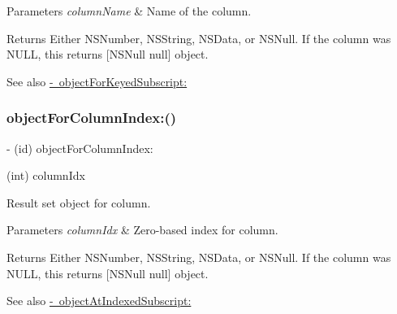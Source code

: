 \begin{DoxyParams}{Parameters}
{\em column\+Name} & Name of the column.\\
\hline
\end{DoxyParams}
\begin{DoxyReturn}{Returns}
Either {\ttfamily N\+S\+Number}, {\ttfamily N\+S\+String}, {\ttfamily N\+S\+Data}, or {\ttfamily N\+S\+Null}. If the column was {\ttfamily N\+U\+LL}, this returns {\ttfamily \mbox{[}N\+S\+Null null\mbox{]}} object.
\end{DoxyReturn}
\begin{DoxySeeAlso}{See also}
\mbox{\hyperlink{interface_o_p_t_l_y_f_m_d_b_result_set_ae62a2c515a8cfe62a26bc5d340f91f72}{-\/ object\+For\+Keyed\+Subscript\+:}} 
\end{DoxySeeAlso}
\mbox{\label{interface_o_p_t_l_y_f_m_d_b_result_set_a8ab70c23da0b55086576b3cecfdef898}} 
\subsubsection{\texorpdfstring{object\+For\+Column\+Index\+:()}{objectForColumnIndex:()}}
{\footnotesize\ttfamily -\/ (id) object\+For\+Column\+Index\+: \begin{DoxyParamCaption}\item[{(int)}]{column\+Idx }\end{DoxyParamCaption}}

Result set object for column.


\begin{DoxyParams}{Parameters}
{\em column\+Idx} & Zero-\/based index for column.\\
\hline
\end{DoxyParams}
\begin{DoxyReturn}{Returns}
Either {\ttfamily N\+S\+Number}, {\ttfamily N\+S\+String}, {\ttfamily N\+S\+Data}, or {\ttfamily N\+S\+Null}. If the column was {\ttfamily N\+U\+LL}, this returns {\ttfamily \mbox{[}N\+S\+Null null\mbox{]}} object.
\end{DoxyReturn}
\begin{DoxySeeAlso}{See also}
\mbox{\hyperlink{interface_o_p_t_l_y_f_m_d_b_result_set_a497f36dbe6e774a9951b329d4bb7f4b1}{-\/ object\+At\+Indexed\+Subscript\+:}} 
\end{DoxySeeAlso}
\mbox{\label{interface_o_p_t_l_y_f_m_d_b_result_set_ae62a2c515a8cfe62a26bc5d340f91f72}} 
